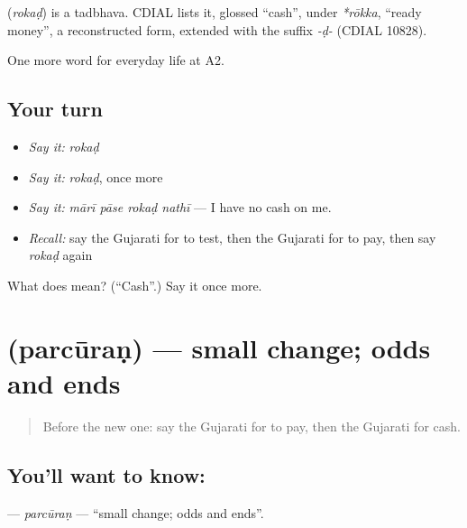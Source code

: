 \begin{cousinweb}
\textbf{} (\emph{rokaḍ}) is a tadbhava. CDIAL lists it, glossed \textquotedblleft{}cash\textquotedblright{}, under \emph{*rōkka}, \textquotedblleft{}ready money\textquotedblright{}, a reconstructed form, extended with the suffix \emph{-ḍ-} (CDIAL 10828).
\end{cousinweb}

\begin{grammarlens}[title={What you've built}]
One more word for everyday life at A2.
\end{grammarlens}

\subsection*{Your turn}
\begin{itemize}
\raggedright
  \item \emph{Say it:} \emph{rokaḍ}
  \item \emph{Say it:} \emph{rokaḍ}, once more
  \item \emph{Say it:} \emph{mārī pāse rokaḍ nathī} — I have no cash on me.
  \item \emph{Recall:} say the Gujarati for to test, then the Gujarati for to pay, then say \emph{rokaḍ} again
\end{itemize}

\begin{tcolorbox}[breakable,colback=teal!4,colframe=teal!35!black,title={Before you move on}]
What does  mean? (\textquotedblleft{}Cash\textquotedblright{}.) Say it once more.
\end{tcolorbox}
\section[\texorpdfstring{\gu{પરચૂરણ} (parcūraṇ)}{પરચૂરણ (parcūraṇ)}]{ (parcūraṇ) — small change; odds and ends}

\label{lesson:GU-C186-parcuran}



\begin{quote}
Before the new one: say the Gujarati for to pay, then the Gujarati for cash.
\end{quote}

\subsection*{You'll want to know: }
\textbf{} — \emph{parcūraṇ} — \textquotedblleft{}small change; odds and ends\textquotedblright{}.

